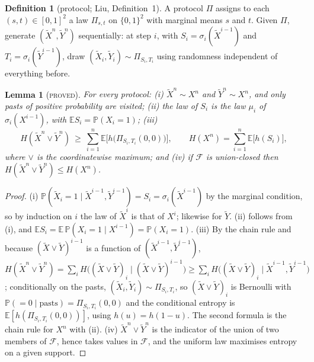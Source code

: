 \documentclass[11pt]{article}
\theoremstyle{plain}
\newtheorem{lemma}[theorem]{Lemma}
\theoremstyle{definition}
\newtheorem{definition}[theorem]{Definition}
\theoremstyle{remark}
\newcommand{\E}{\mathbb{E}}
\newcommand{\Prob}{\mathbb{P}}
\newcommand{\lbl}[1]{\textsc{#1}}
\begin{document}
\begin{definition}[protocol; Liu, Definition~1]
A protocol $\Pi$ assigns to each $(s,t)\in[0,1]^2$ a law $\Pi_{s,t}$ on
$\{0,1\}^2$ with marginal means $s$ and $t$.  Given $\Pi$, generate
$(\tilde X^n,\tilde Y^n)$ sequentially: at step $i$, with
$S_i=\sigma_i(\tilde X^{i-1})$ and $T_i=\sigma_i(\tilde Y^{i-1})$, draw
$(\tilde X_i,\tilde Y_i)\sim\Pi_{S_i,T_i}$ using randomness independent of
everything before.
\end{definition}

\begin{lemma}[\lbl{proved}]\label{lem:protocol}
For every protocol: (i) $\tilde X^n\sim X^n$ and $\tilde Y^n\sim X^n$, and only
pasts of positive probability are visited; (ii) the law of $S_i$ is the law
$\mu_i$ of $\sigma_i(X^{i-1})$, with $\E S_i=\Prob(X_i=1)$; (iii)
\[
  H(\tilde X^n\vee\tilde Y^n)\ \ge\ \sum_{i=1}^n\E\bigl[h\bigl(\Pi_{S_i,T_i}(0,0)\bigr)\bigr],
  \qquad H(X^n)=\sum_{i=1}^n\E\bigl[h(S_i)\bigr],
\]
where $\vee$ is the coordinatewise maximum; and (iv) if $\mathcal F$ is
union-closed then $H(\tilde X^n\vee\tilde Y^n)\le H(X^n)$.
\end{lemma}
\begin{proof}
(i) $\Prob(\tilde X_i=1\mid\tilde X^{i-1},\tilde Y^{i-1})=S_i=\sigma_i(\tilde X^{i-1})$
by the marginal condition, so by induction on $i$ the law of $\tilde X^i$ is
that of $X^i$; likewise for $\tilde Y$.  (ii) follows from (i), and
$\E S_i=\E\,\Prob(X_i=1\mid X^{i-1})=\Prob(X_i=1)$.  (iii) By the chain rule and
because $(\tilde X\vee\tilde Y)^{i-1}$ is a function of
$(\tilde X^{i-1},\tilde Y^{i-1})$,
$H(\tilde X^n\vee\tilde Y^n)=\sum_iH\bigl((\tilde X\vee\tilde Y)_i\mid(\tilde X\vee\tilde Y)^{i-1}\bigr)
\ge\sum_iH\bigl((\tilde X\vee\tilde Y)_i\mid\tilde X^{i-1},\tilde Y^{i-1}\bigr)$;
conditionally on the pasts, $(\tilde X_i,\tilde Y_i)\sim\Pi_{S_i,T_i}$, so
$(\tilde X\vee\tilde Y)_i$ is Bernoulli with
$\Prob(=0\mid\text{pasts})=\Pi_{S_i,T_i}(0,0)$ and the conditional entropy is
$\E[h(\Pi_{S_i,T_i}(0,0))]$, using $h(u)=h(1-u)$.  The second formula is the
chain rule for $X^n$ with (ii).  (iv) $\tilde X^n\vee\tilde Y^n$ is the
indicator of the union of two members of $\mathcal F$, hence takes values in
$\mathcal F$, and the uniform law maximises entropy on a given support.
\end{proof}
\end{document}
